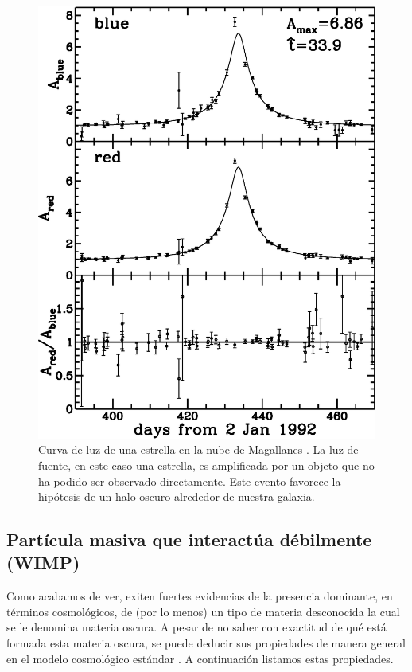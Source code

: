 \begin{figure}[h]
\centering
  \includegraphics[height=0.8\linewidth]{Images/fluxes.eps}
  \caption[Microlentes: Curva de luz de una estrella en la nube de Magallanes]{Curva de luz de una estrella en la nube de Magallanes \cite{alcock1993possible}. La luz de fuente, en este caso una estrella, es amplificada por un objeto que no ha podido ser observado directamente. Este evento favorece la hipótesis de un halo oscuro alrededor de nuestra galaxia.}
\label{Amplification-LigthCurve}
\end{figure}



\newpage
\subsection[\hspace{-0.4in}) Partícula masiva que interactúa débilmente (WIMP)]{Partícula masiva que interactúa débilmente (WIMP)}

Como acabamos de ver, exiten fuertes evidencias de la presencia dominante, en términos cosmológicos, de (por lo menos) un tipo de materia desconocida la cual se le denomina materia oscura. A pesar de no saber con exactitud de qué está formada esta materia oscura, se puede deducir sus propiedades de manera general en el modelo cosmológico estándar \cite{Arcadi:2024ukq}. A continuación listamos  estas propiedades.

